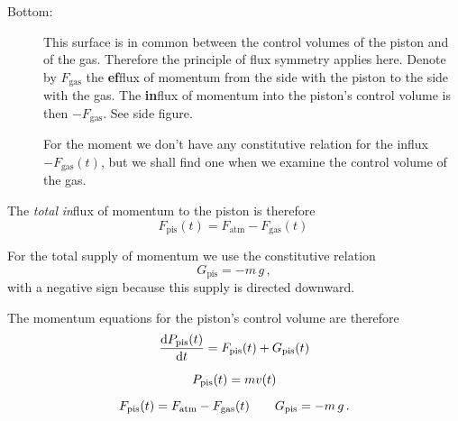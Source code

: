\documentclass[a4paper,12pt,%
onecolumn,oneside,%
british%
]{memoir}
\newcommand*{\di}{\mathop{}\!\mathrm{d}}%
\renewcommand*{\|}[1][]{\nonscript\:#1\vert\nonscript\:\mathopen{}}
\newcommand*{\dt}{\di t}
\newcommand*{\ym}{m}%
\newcommand*{\yPpi}{P_{\textrm{pis}}}
\newcommand*{\yGpi}{G_{\textrm{pis}}}
\newcommand*{\yFpi}{F_{\textrm{pis}}}
\newcommand*{\yFgas}{F_{\textrm{gas}}}
\newcommand*{\yFatm}{F_{\textrm{atm}}}
\begin{document}
\begin{description}
\item[Bottom:] This surface is in common between the control volumes of the piston and of the gas. Therefore the principle of flux symmetry applies here. Denote by $\yFgas$ the \textbf{ef}flux of momentum from the side with the piston to the side with the gas. The \textbf{in}flux of momentum into the piston's control volume is then $-\yFgas$. See side figure.


  For the moment we don't have any constitutive relation for the influx $-\yFgas(t)$, but we shall find one when we examine the control volume of the gas.
\end{description}

The \emph{total} \emph{in}flux of momentum to the piston is therefore
\begin{equation}
  \label{eq:F_piston}
  \yFpi(t) = \yFatm - \yFgas(t) \,
\end{equation}

\medskip

For the total supply of momentum we use the constitutive relation
\begin{equation}
  \label{eq:piston_G}
  \yGpi = -\ym\,g \,,
\end{equation}
with a negative sign because this supply is directed downward.

\medskip

The momentum equations for the piston's control volume are therefore
\begin{equation}
  \label{eq:piston_equations}
  \begin{gathered}
    \frac{\di \yPpi(t)}{\dt} = \yFpi(t) + \yGpi(t)
    \\[2\jot]
    \yPpi(t) = \ym v(t)
    \\[2\jot]
    \yFpi(t) = \yFatm - \yFgas(t)
    \qquad
    \yGpi = -\ym\,g
    \,.
  \end{gathered}
\end{equation}
\end{document}
